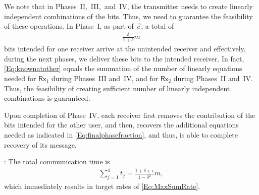 \documentclass[journal,12pt,draftcls,onecolumn]{IEEEtran}
\newcommand{\msf}{\mathsf}
\begin{document}
We note that in Phases~II,~III,~and~IV, the transmitter needs to create linearly independent combinations of the bits. Thus, we need to guarantee the feasibility of these operations. In Phase~I, as part of $\vec{c}$, a total of
\begin{align}
\label{Eq:knownatother}
\frac{\delta}{1+\delta}m
\end{align}
bits intended for one receiver arrive at the unintended receiver and effectively, during the next phases, we deliver these bits to the intended receiver. In fact, \eqref{Eq:knownatother} equals the summation of the number of linearly equations needed for $\msf{Rx}_1$ during Phases~III and~IV, and for $\msf{Rx}_2$ during Phases~II and~IV. Thus, the feasibility of creating sufficient number of linearly independent combinations is guaranteed.

Upon completion of Phase~IV, each receiver first removes the contribution of the bits intended for the other user, and then, recovers the additional equations needed as indicated in \eqref{Eq:finalphasefraction}, and thus, is able to complete recovery of its message.

: The total communication time is
\begin{align}
\label{Eq:totaltime}
\sum_{j=1}^{4}{t_j} = \frac{1+\delta+\epsilon}{1-\delta^2}m,
\end{align}
which immediately results in target rates of \eqref{Eq:MaxSumRate}.
\end{document}
